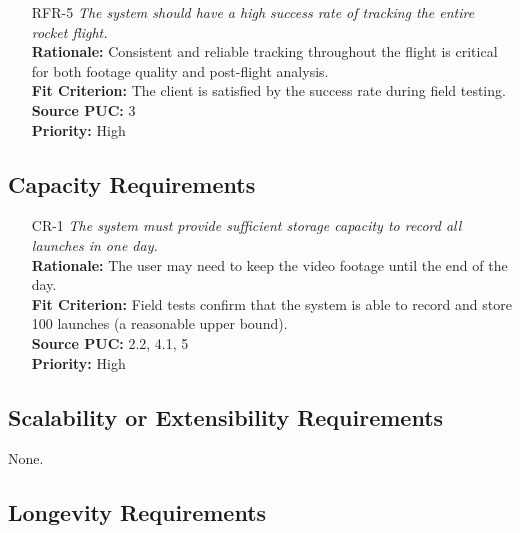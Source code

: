 \documentclass[12pt]{article}
\begin{document}
\begin{itemize}[leftmargin=*]
{          rocket is lost.}\\[2mm]
        \textbf{Rationale:} Rocket may be temporarily obstructed, re-acquisition improves the robustness of the tracking process.\\
        \textbf{Fit Criterion:} The system waits for 2 seconds before declaring the rocket is lost.\\
        \textbf{Source PUC:} 3 \\
        \textbf{Priority:} Medium
  \item[RFR-5] \emph{The system should have a high success rate of tracking the entire
          rocket flight.}\\[2mm]
        \textbf{Rationale:} Consistent and reliable tracking throughout the flight is critical for both footage quality and post-flight analysis.\\
        \textbf{Fit Criterion:} The client is satisfied by the success rate during field testing.\\
        \textbf{Source PUC:} 3 \\
        \textbf{Priority:} High
\end{itemize}

\subsection{Capacity Requirements}
\begin{itemize}[leftmargin=*]
  \item[CR-1] \emph{The system must provide sufficient storage capacity to record all
          launches in one day.}\\[2mm]
        \textbf{Rationale:} The user may need to keep the video footage until the end of the day.\\
        \textbf{Fit Criterion:} Field tests confirm that the system is able to record and store 100 launches (a reasonable upper bound).\\
        \textbf{Source PUC:} 2.2, 4.1, 5 \\
        \textbf{Priority:} High
\end{itemize}

\subsection{Scalability or Extensibility Requirements}

None.

\subsection{Longevity Requirements}
\end{document}
